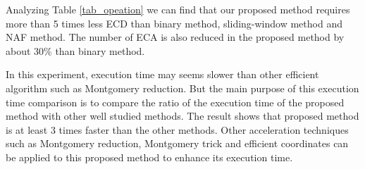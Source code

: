 \renewcommand{\baselinestretch}{1.5}
\begin{table}[!ht]
\centering
\caption{ Comparative result of average number of ECA and ECD and execution time in [ms] for scalar multiplication}
\label{tab_opeation}
\end{table}
\renewcommand{\baselinestretch}{1.0}
Analyzing  Table \ref{tab_opeation} we can find that our proposed method requires more than 5 times less ECD than binary method, sliding-window method and NAF method. The number of ECA is also reduced in the proposed method by about 30\% than binary method.  

In this experiment, execution time may seems slower than other efficient algorithm such as Montgomery reduction. 
But the main purpose of this execution time comparison is to compare the ratio of the execution time of the proposed method with other well studied methods. The result shows that proposed method is at least 3 times faster than the other methods. Other acceleration techniques such as Montgomery reduction, Montgomery trick and efficient coordinates can be applied to this proposed method to enhance its execution time.

